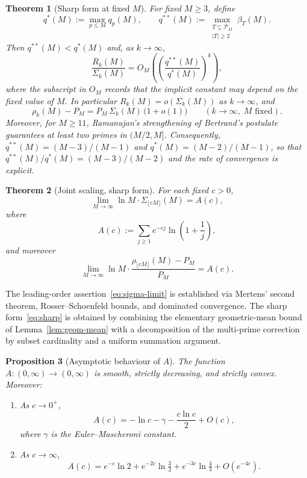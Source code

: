 \documentclass[11pt]{article}
\newtheorem{theorem}{Theorem}
\newtheorem{proposition}[theorem]{Proposition}
\theoremstyle{remark}
\newcommand{\PM}{\mathcal{P}_M}
\begin{document}
\begin{theorem}[Sharp form at fixed $M$]\label{thm:sharp-fixed-M}
For fixed $M \geq 3$, define
\[
q^{*}(M) := \max_{p \leq M} q_p(M),
\qquad
q^{**}(M) := \max_{\substack{T \subseteq \PM\\ |T| \geq 2}} \beta_T(M).
\]
Then $q^{**}(M) < q^{*}(M)$ and, as $k \to \infty$,
\begin{equation}\label{eq:sharp-fixed-M}
\frac{R_k(M)}{\Sigma_k(M)} = O_M\!\left(\left(\frac{q^{**}(M)}{q^{*}(M)}\right)^{\!k}\right),
\end{equation}
where the subscript in $O_M$ records that the implicit constant may depend on the fixed value of $M$. In particular $R_k(M) = o(\Sigma_k(M))$ as $k \to \infty$, and
\[
\rho_k(M) - P_M = P_M\, \Sigma_k(M)\,\bigl(1 + o(1)\bigr) \qquad (k \to \infty,\; M \text{ fixed}).
\]
Moreover, for $M \geq 11$, Ramanujan's strengthening of Bertrand's postulate~\cite{Ramanujan1919} guarantees at least two primes in $(M/2, M]$. Consequently, $q^{**}(M) = (M-3)/(M-1)$ and $q^{*}(M) = (M-2)/(M-1)$, so that $q^{**}(M)/q^{*}(M) = (M-3)/(M-2)$ and the rate of convergence is explicit.
\end{theorem}

\begin{theorem}[Joint scaling, sharp form]\label{thm:joint-sharp}
For each fixed $c > 0$,
\begin{equation}\label{eq:sigma-limit}
\lim_{M \to \infty} \ln M \cdot \Sigma_{\lfloor cM \rfloor}(M) = A(c),
\end{equation}
where
\begin{equation}\label{eq:A-def}
A(c) := \sum_{j \geq 1} e^{-cj} \ln\!\left(1 + \frac{1}{j}\right),
\end{equation}
and moreover
\begin{equation}\label{eq:sharp}
\lim_{M \to \infty} \ln M \cdot \frac{\rho_{\lfloor cM \rfloor}(M) - P_M}{P_M} = A(c).
\end{equation}
\end{theorem}

The leading-order assertion~\eqref{eq:sigma-limit} is established via Mertens' second theorem, Rosser--Schoenfeld bounds, and dominated convergence. The sharp form~\eqref{eq:sharp} is obtained by combining the elementary geometric-mean bound of Lemma~\ref{lem:geom-mean} with a decomposition of the multi-prime correction by subset cardinality and a uniform summation argument.

\begin{proposition}[Asymptotic behaviour of $A$]\label{prop:A-asymptotics}
The function $A \colon (0, \infty) \to (0, \infty)$ is smooth, strictly decreasing, and strictly convex. Moreover:
\begin{enumerate}[label=(\roman*), leftmargin=2em]
\item As $c \to 0^+$,
\[
A(c) = -\ln c - \gamma - \frac{c \ln c}{2} + O(c),
\]
where $\gamma$ is the Euler--Mascheroni constant.
\item As $c \to \infty$,
\[
A(c) = e^{-c} \ln 2 + e^{-2c} \ln \tfrac{3}{2} + e^{-3c}\ln\tfrac{4}{3} + O(e^{-4c}).
\]
\end{enumerate}
\end{proposition}
\end{document}
